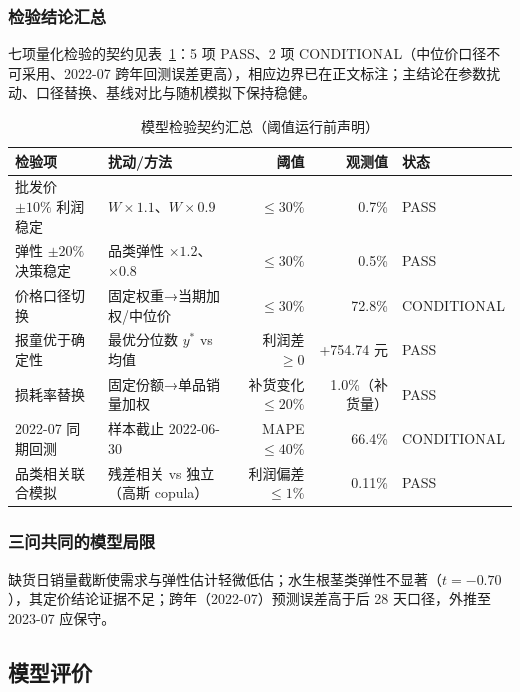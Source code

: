 \subsubsection{检验结论汇总}

七项量化检验的契约见表~\ref{tab:summary}：5 项 PASS、2 项 CONDITIONAL（中位价口径不可采用、2022-07 跨年回测误差更高），相应边界已在正文标注；主结论在参数扰动、口径替换、基线对比与随机模拟下保持稳健。

\begin{table}[H]
\centering
\caption{模型检验契约汇总（阈值运行前声明）}
\label{tab:summary}
\begin{tabular}{l l r r l}
\toprule
检验项 & 扰动/方法 & 阈值 & 观测值 & 状态 \\
\midrule
批发价 $\pm10\%$ 利润稳定 & $W\times1.1$、$W\times0.9$ & $\le30\%$ & 0.7\% & PASS \\
弹性 $\pm20\%$ 决策稳定 & 品类弹性 $\times1.2$、$\times0.8$ & $\le30\%$ & 0.5\% & PASS \\
价格口径切换 & 固定权重→当期加权/中位价 & $\le30\%$ & 72.8\% & CONDITIONAL \\
报童优于确定性 & 最优分位数 $y^*$ vs 均值 & 利润差 $\ge0$ & +754.74 元 & PASS \\
损耗率替换 & 固定份额→单品销量加权 & 补货变化 $\le20\%$ & 1.0\%（补货量） & PASS \\
2022-07 同期回测 & 样本截止 2022-06-30 & MAPE $\le40\%$ & 66.4\% & CONDITIONAL \\
品类相关联合模拟 & 残差相关 vs 独立（高斯 copula） & 利润偏差 $\le1\%$ & 0.11\% & PASS \\
\bottomrule
\end{tabular}
\end{table}

\subsubsection{三问共同的模型局限}

缺货日销量截断使需求与弹性估计轻微低估；水生根茎类弹性不显著（$t=-0.70$），其定价结论证据不足；跨年（2022-07）预测误差高于后 28 天口径，外推至 2023-07 应保守。

\subsection{模型评价}

